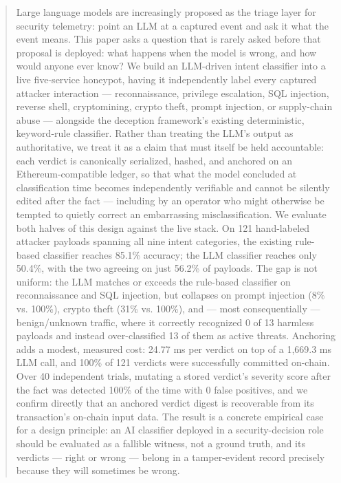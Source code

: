 \documentclass[journal,10pt,twocolumn]{IEEEtran}
\begin{document}
\begin{abstract}
Large language models are increasingly proposed as the triage layer for security telemetry: point an LLM at a captured event and ask it what the event means. This paper asks a question that is rarely asked before that proposal is deployed: what happens when the model is wrong, and how would anyone ever know? We build an LLM-driven intent classifier into a live five-service honeypot, having it independently label every captured attacker interaction --- reconnaissance, privilege escalation, SQL injection, reverse shell, cryptomining, crypto theft, prompt injection, or supply-chain abuse --- alongside the deception framework's existing deterministic, keyword-rule classifier. Rather than treating the LLM's output as authoritative, we treat it as a claim that must itself be held accountable: each verdict is canonically serialized, hashed, and anchored on an Ethereum-compatible ledger, so that what the model concluded at classification time becomes independently verifiable and cannot be silently edited after the fact --- including by an operator who might otherwise be tempted to quietly correct an embarrassing misclassification. We evaluate both halves of this design against the live stack. On 121 hand-labeled attacker payloads spanning all nine intent categories, the existing rule-based classifier reaches 85.1\% accuracy; the LLM classifier reaches only 50.4\%, with the two agreeing on just 56.2\% of payloads. The gap is not uniform: the LLM matches or exceeds the rule-based classifier on reconnaissance and SQL injection, but collapses on prompt injection (8\% vs. 100\%), crypto theft (31\% vs. 100\%), and --- most consequentially --- benign/unknown traffic, where it correctly recognized 0 of 13 harmless payloads and instead over-classified 13 of them as active threats. Anchoring adds a modest, measured cost: 24.77 ms per verdict on top of a 1,669.3 ms LLM call, and 100\% of 121 verdicts were successfully committed on-chain. Over 40 independent trials, mutating a stored verdict's severity score after the fact was detected 100\% of the time with 0 false positives, and we confirm directly that an anchored verdict digest is recoverable from its transaction's on-chain input data. The result is a concrete empirical case for a design principle: an AI classifier deployed in a security-decision role should be evaluated as a fallible witness, not a ground truth, and its verdicts --- right or wrong --- belong in a tamper-evident record precisely because they will sometimes be wrong.
\end{abstract}
\end{document}
